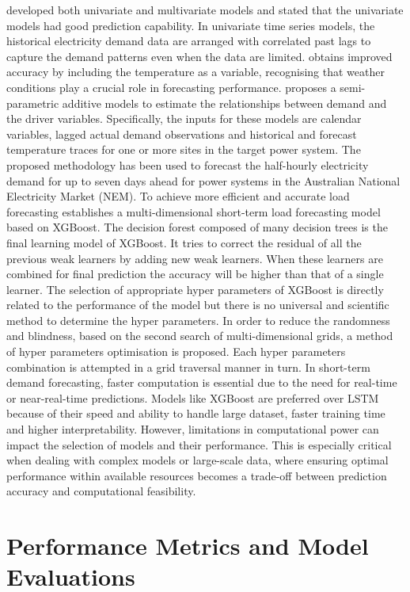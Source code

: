 \documentclass[mstat,12pt]{unswthesis}
\begin{document}
\cite{taylor2009forecasting} developed both univariate and multivariate
models and stated that the univariate models had good prediction
capability. In univariate time series models, the historical electricity
demand data are arranged with correlated past lags to capture the demand
patterns even when the data are limited. \cite{mcculloch2001forecasting}
obtains improved accuracy by including the temperature as a variable,
recognising that weather conditions play a crucial role in forecasting
performance. \cite{Fan2012} proposes a semi-parametric additive models
to estimate the relationships between demand and the driver variables.
Specifically, the inputs for these models are calendar variables, lagged
actual demand observations and historical and forecast temperature
traces for one or more sites in the target power system. The proposed
methodology has been used to forecast the half-hourly electricity demand
for up to seven days ahead for power systems in the Australian National
Electricity Market (NEM). To achieve more efficient and accurate load
forecasting \cite{Suo} establishes a multi-dimensional short-term load
forecasting model based on XGBoost. The decision forest composed of many
decision trees is the final learning model of XGBoost. It tries to
correct the residual of all the previous weak learners by adding new
weak learners. When these learners are combined for final prediction the
accuracy will be higher than that of a single learner. The selection of
appropriate hyper parameters of XGBoost is directly related to the
performance of the model but there is no universal and scientific method
to determine the hyper parameters. In order to reduce the randomness and
blindness, based on the second search of multi-dimensional grids, a
method of hyper parameters optimisation is proposed. Each hyper
parameters combination is attempted in a grid traversal manner in turn.
In short-term demand forecasting, faster computation is essential due to
the need for real-time or near-real-time predictions. Models like
XGBoost are preferred over LSTM because of their speed and ability to
handle large dataset, faster training time and higher interpretability.
However, limitations in computational power can impact the selection of
models and their performance. This is especially critical when dealing
with complex models or large-scale data, where ensuring optimal
performance within available resources becomes a trade-off between
prediction accuracy and computational feasibility.

\section{Performance Metrics and Model
Evaluations}\label{performance-metrics-and-model-evaluations}
\end{document}
